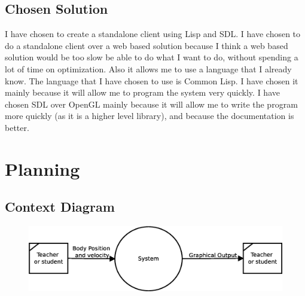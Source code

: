 \subsection{Chosen Solution}
I have chosen to create a standalone client using Lisp and SDL\@. I have chosen
to do a standalone client over a web based solution because I think a web based
solution would be too slow be able to do what I want to do, without spending a
lot of time on optimization. Also it allows me to use a language that I already
know. The language that I have chosen to use is Common Lisp. I have chosen it
mainly because it will allow me to program the system very quickly. I have
chosen SDL over OpenGL mainly because it will allow me to write the program more
quickly (as it is a higher level library), and because the documentation is
better.

\section{Planning}

\subsection{Context Diagram}
\begin{figure}[H]
	\includegraphics[width=\textwidth]{./img/context.eps}
	\label{fig:context}
\end{figure}

